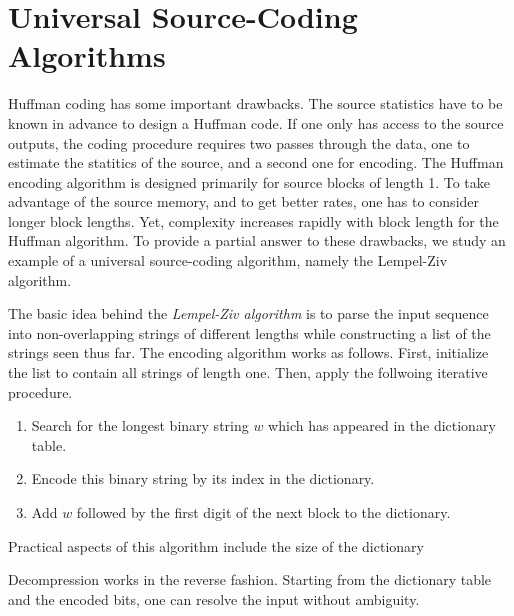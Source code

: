 \section{Universal Source-Coding Algorithms}

Huffman coding has some important drawbacks.
The source statistics have to be known in advance to design a Huffman code.
If one only has access to the source outputs, the coding procedure requires two passes through the data, one to estimate the statitics of the source, and a second one for encoding.
The Huffman encoding algorithm is designed primarily for source blocks of length 1.
To take advantage of the source memory, and to get better rates, one has to consider longer block lengths.
Yet, complexity increases rapidly with block length for the Huffman algorithm. 
To provide a partial answer to these drawbacks, we study an example of a universal source-coding algorithm, namely the Lempel-Ziv algorithm.

The basic idea behind the \emph{Lempel-Ziv algorithm} is to parse the input sequence into non-overlapping strings of different lengths while constructing a list of the strings seen thus far.
The encoding algorithm works as follows.
First, initialize the list to contain all strings of length one.
Then, apply the follwoing iterative procedure.
\begin{enumerate}
\item Search for the longest binary string $w$ which has appeared in the dictionary table.
\item Encode this binary string by its index in the dictionary.
\item Add $w$ followed by the first digit of the next block to the dictionary.
\end{enumerate}
Practical aspects of this algorithm include the size of the dictionary

Decompression works in the reverse fashion.
Starting from the dictionary table and the encoded bits, one can resolve the input without ambiguity.

